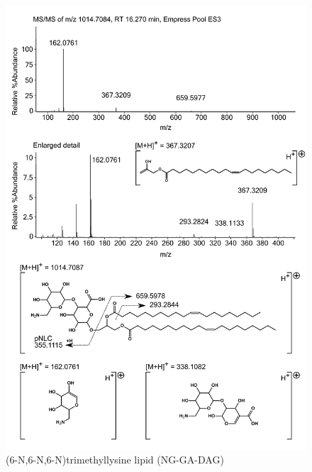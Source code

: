 \begin{figure}[h]
\centering
\includegraphics[width=\linewidth]{figs_app1/NG-GA-DAG}
\caption{(6-N,6-N,6-N)trimethyllysine lipid (NG-GA-DAG)}
\label{fig:NG-GA-DAG}
\end{figure}

